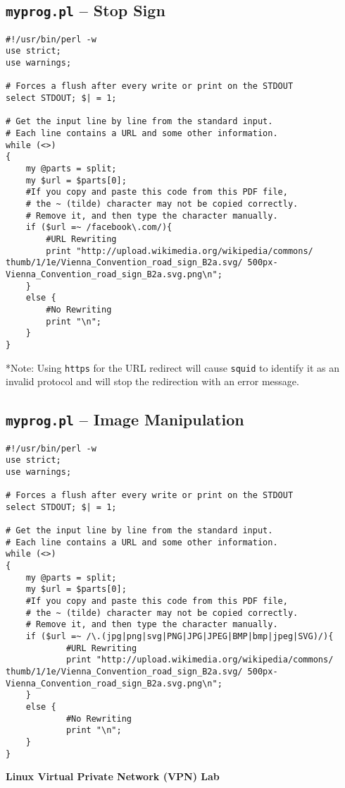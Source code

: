 \documentclass[a4paper,12pt]{article}
\begin{document}
\subsection{\texttt{myprog.pl} -- Stop Sign}
\label{ch:AppBStop}
\begin{verbatim}
#!/usr/bin/perl -w
use strict;
use warnings;

# Forces a flush after every write or print on the STDOUT
select STDOUT; $| = 1;

# Get the input line by line from the standard input.
# Each line contains a URL and some other information.
while (<>)
{
	my @parts = split;
	my $url = $parts[0];
	#If you copy and paste this code from this PDF file,
	# the ~ (tilde) character may not be copied correctly.
	# Remove it, and then type the character manually.
	if ($url =~ /facebook\.com/){
		#URL Rewriting
		print "http://upload.wikimedia.org/wikipedia/commons/ thumb/1/1e/Vienna_Convention_road_sign_B2a.svg/ 500px-Vienna_Convention_road_sign_B2a.svg.png\n";
	}
	else {
		#No Rewriting
		print "\n";
	}
}
\end{verbatim}
*Note: Using \texttt{https} for the URL redirect will cause \texttt{squid} to identify it as an invalid protocol and will stop the redirection with an error message.
\subsection{\texttt{myprog.pl} -- Image Manipulation}
\label{ch:AppBImgMod}
\begin{verbatim}
#!/usr/bin/perl -w
use strict;
use warnings;

# Forces a flush after every write or print on the STDOUT
select STDOUT; $| = 1;

# Get the input line by line from the standard input.
# Each line contains a URL and some other information.
while (<>)
{
    my @parts = split;
    my $url = $parts[0];
    #If you copy and paste this code from this PDF file,
    # the ~ (tilde) character may not be copied correctly.
    # Remove it, and then type the character manually.
    if ($url =~ /\.(jpg|png|svg|PNG|JPG|JPEG|BMP|bmp|jpeg|SVG)/){
            #URL Rewriting
            print "http://upload.wikimedia.org/wikipedia/commons/ thumb/1/1e/Vienna_Convention_road_sign_B2a.svg/ 500px-Vienna_Convention_road_sign_B2a.svg.png\n";
    }
    else {
            #No Rewriting
            print "\n";
    }
}

\end{verbatim}
\begin{titlepage}
		\begin{center}
		\vspace*{27em}
		\Huge
			\textbf{Linux Virtual Private Network (VPN) Lab}
			\vfill
		\end{center}
	\end{titlepage}
	
\end{document}
